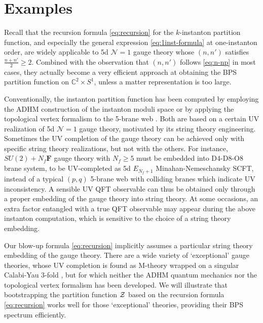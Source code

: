\documentclass[letterpaper, 11pt]{article}
\def\IC{\mathbb{C}}
\def\CZ{{\cal Z}}
\begin{document}
{%





\section{Examples} \label{sec:example}

Recall that the recursion formula \eqref{eq:recursion} for the $k$-instanton partition function, and especially the general expression \eqref{eq:1inst-formula} at one-instanton order, are widely applicable to 5d $\mathcal{N}=1$ gauge theory whose $(n,n')$ satisfies $\frac{n+n'}{2}\geq 2$. Combined with the observation that $(n,n')$ follows \eqref{eq:n-np} in most cases, they actually become  a very efficient approach at obtaining the BPS partition function on $\IC^2 \times S^1$, unless a matter representation is too large. 

Conventionally, the instanton partition function has been  computed by employing the ADHM construction of the instanton moduli space \cite{Atiyah:1978ri,Nekrasov:2002qd,Nekrasov:2003rj} or by applying the topological vertex formalism to the 5-brane web \cite{Aganagic:2003db,Iqbal:2007ii}. Both are based on a certain UV realization of 5d $\mathcal{N}=1$ gauge theory,  motivated by its string theory engineering. Sometimes the UV completion of the gauge theory can be achieved only with specific string theory realizations, but not with the others. For instance, $SU(2) + N_f \mathbf{F}$ gauge theory with $N_f\geq 5$ must be embedded into D4-D8-O8 brane system, to be UV-completed as 5d $E_{N_f+1}$ Minahan-Nemeschansky SCFT, instead of a typical $(p,q)$ 5-brane web with colliding branes which indicate UV inconsistency. A sensible UV QFT observable can thus be 
obtained only through a proper embedding of the gauge theory into string theory. At some occasions, an extra factor entangled with a true QFT observable may  appear during the above instanton computation, which is sensitive to the choice of a string theory embedding.


Our blow-up formula \eqref{eq:recursion} implicitly assumes a particular string theory embedding of the gauge theory.  There are a wide variety of `exceptional' gauge theories, whose UV completion is found as M-theory wrapped on a singular Calabi-Yau 3-fold \cite{Diaconescu:1998cn, Jefferson:2018irk, Bhardwaj:2018yhy, Apruzzi:2019opn}, but for which neither the ADHM quantum mechanics nor the topological vertex formalism has been developed. We will illustrate that bootstrapping the partition function $\CZ$ based on the recursion formula \eqref{eq:recursion} works well for those `exceptional' theories, providing their BPS spectrum efficiently.





}
\end{document}
